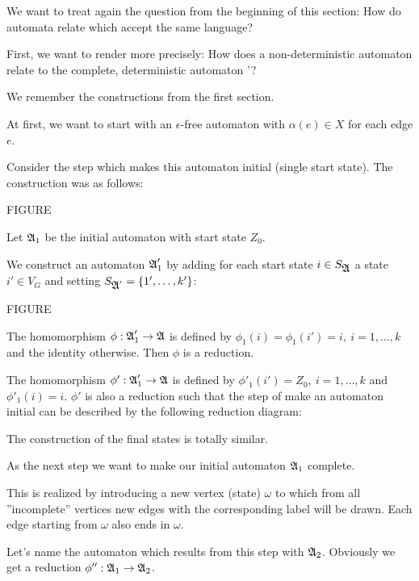 We want to treat again the question from the beginning of this section: How do
automata relate which accept the same language?

First, we want to render more precisely: How does a non-deterministic automaton
 relate to the complete, deterministic automaton '?

We remember the constructions from the first section.

At first, we want to start with an $\epsilon$-free automaton with $\alpha(e)
\in X$ for each edge $e$.

Consider the step which makes this automaton initial (single start state). The
construction was as follows:

FIGURE

Let $\mbox{$\mathfrak{A}$}_1$ be the initial automaton with start state $Z_0$.

We construct an automaton $\mbox{$\mathfrak{A}$}'_1$ by adding for each start state $i \in
S_{\mbox{$\mathfrak{A}$}}$ a state $i' \in V_G$ and setting $S_{\mbox{$\mathfrak{A}$}'} = \{ 1', \ldots, k'
\}$:

FIGURE

The homomorphism $\phi : \mbox{$\mathfrak{A}$}'_1 \to \mbox{$\mathfrak{A}$}$ is defined by $\phi_1(i) =
\phi_1(i') = i,\ i = 1, \ldots, k$ and the identity otherwise. Then $\phi$ is a
reduction.

The homomorphism $\phi' : \mbox{$\mathfrak{A}$}_1' \to \mbox{$\mathfrak{A}$}$ is defined by $\phi'_1(i') =
Z_0,\ i = 1, \ldots, k$ and $\phi'_1(i) = i$. $\phi'$ is also a reduction such
that the step of make an automaton initial can be described by the following
reduction diagram:

\begin{center}
\end{center}

The construction of the final states is totally similar.

As the next step we want to make our initial automaton $\mbox{$\mathfrak{A}$}_1$ complete.

This is realized by introducing a new vertex (state) $\omega$ to which from all 
''incomplete'' vertices new edges with the corresponding label will be drawn.
Each edge starting from $\omega$ also ends in $\omega$.

Let's name the automaton which results from this step with $\mbox{$\mathfrak{A}$}_2$. Obviously
we get a reduction $\phi'' : \mbox{$\mathfrak{A}$}_1 \to \mbox{$\mathfrak{A}$}_2$.

